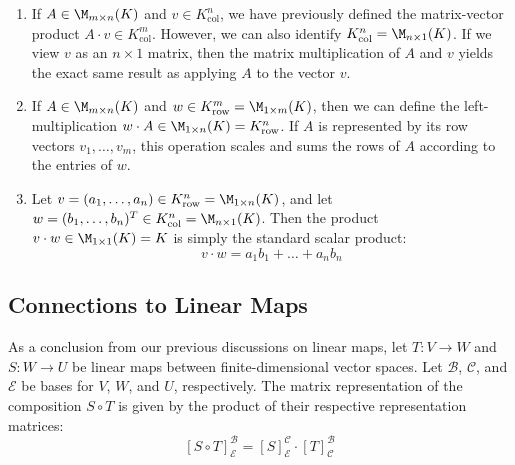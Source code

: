 \begin{enumerate}
    \item If $A \in \M_{m \times n}(K)$ and $v \in K_{\text{col}}^{n}$, we have previously defined the matrix-vector product $A \cdot v \in K_{\text{col}}^{m}$. However, we can also identify $K_{\text{col}}^{n} = \M_{n \times 1}(K)$. If we view $v$ as an $n \times 1$ matrix, then the matrix multiplication of $A$ and $v$ yields the exact same result as applying $A$ to the vector $v$.
    
    \item If $A \in \M_{m \times n}(K)$ and $w \in K_{\text{row}}^{m} = \M_{1 \times m}(K)$, then we can define the left-multiplication $w \cdot A \in \M_{1 \times n}(K) = K_{\text{row}}^{n}$. If $A$ is represented by its row vectors $v_1, \dots, v_m$, this operation scales and sums the rows of $A$ according to the entries of $w$.
    
    \item Let $v = (a_1, \dots, a_n) \in K_{\text{row}}^{n} = \M_{1 \times n}(K)$, and let $w = (b_1, \dots, b_n)^T \in K_{\text{col}}^{n} = \M_{n \times 1}(K)$. Then the product $v \cdot w \in \M_{1 \times 1}(K) = K$ is simply the standard scalar product:
    \begin{equation*}
        v \cdot w = a_1 b_1 + \dots + a_n b_n
    \end{equation*}
\end{enumerate}

\subsection{Connections to Linear Maps}

As a conclusion from our previous discussions on linear maps, let $T: V \to W$ and $S: W \to U$ be linear maps between finite-dimensional vector spaces. Let $\mathcal{B}$, $\mathcal{C}$, and $\mathcal{E}$ be bases for $V$, $W$, and $U$, respectively. The matrix representation of the composition $S \circ T$ is given by the product of their respective representation matrices:
\[
    [S \circ T]_{\mathcal{E}}^{\mathcal{B}} = [S]_{\mathcal{E}}^{\mathcal{C}} \cdot [T]_{\mathcal{C}}^{\mathcal{B}}
\]

\begin{center}
\end{center}

